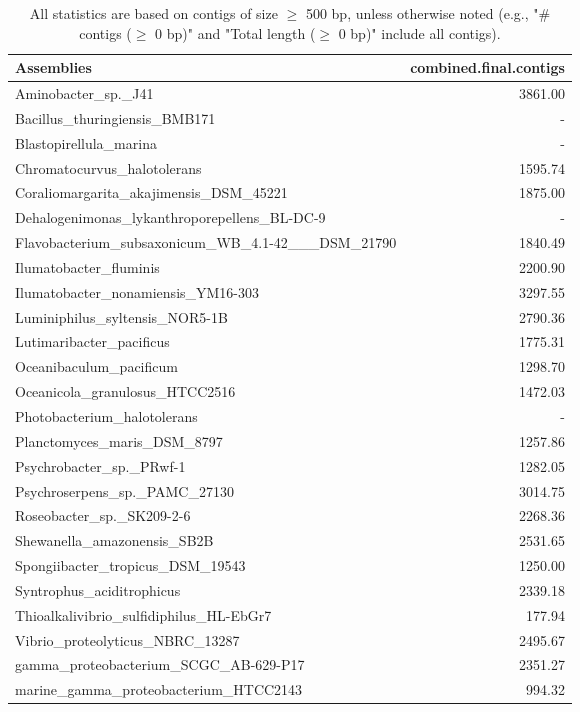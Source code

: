 \documentclass[12pt,a4paper]{article}
\begin{document}
\begin{table}[ht]
\begin{center}
\caption{All statistics are based on contigs of size $\geq$ 500 bp, unless otherwise noted (e.g., "\# contigs ($\geq$ 0 bp)" and "Total length ($\geq$ 0 bp)" include all contigs).}
\begin{tabular}{|l*{1}{|r}|}
\hline
Assemblies & combined.final.contigs \\ \hline
Aminobacter\_sp.\_J41 & 3861.00 \\ \hline
Bacillus\_thuringiensis\_BMB171 & - \\ \hline
Blastopirellula\_marina & - \\ \hline
Chromatocurvus\_halotolerans & 1595.74 \\ \hline
Coraliomargarita\_akajimensis\_DSM\_45221 & 1875.00 \\ \hline
Dehalogenimonas\_lykanthroporepellens\_BL-DC-9 & - \\ \hline
Flavobacterium\_subsaxonicum\_WB\_4.1-42\_\_\_DSM\_21790 & 1840.49 \\ \hline
Ilumatobacter\_fluminis & 2200.90 \\ \hline
Ilumatobacter\_nonamiensis\_YM16-303 & 3297.55 \\ \hline
Luminiphilus\_syltensis\_NOR5-1B & 2790.36 \\ \hline
Lutimaribacter\_pacificus & 1775.31 \\ \hline
Oceanibaculum\_pacificum & 1298.70 \\ \hline
Oceanicola\_granulosus\_HTCC2516 & 1472.03 \\ \hline
Photobacterium\_halotolerans & - \\ \hline
Planctomyces\_maris\_DSM\_8797 & 1257.86 \\ \hline
Psychrobacter\_sp.\_PRwf-1 & 1282.05 \\ \hline
Psychroserpens\_sp.\_PAMC\_27130 & 3014.75 \\ \hline
Roseobacter\_sp.\_SK209-2-6 & 2268.36 \\ \hline
Shewanella\_amazonensis\_SB2B & 2531.65 \\ \hline
Spongiibacter\_tropicus\_DSM\_19543 & 1250.00 \\ \hline
Syntrophus\_aciditrophicus & 2339.18 \\ \hline
Thioalkalivibrio\_sulfidiphilus\_HL-EbGr7 & 177.94 \\ \hline
Vibrio\_proteolyticus\_NBRC\_13287 & 2495.67 \\ \hline
gamma\_proteobacterium\_SCGC\_AB-629-P17 & 2351.27 \\ \hline
marine\_gamma\_proteobacterium\_HTCC2143 & 994.32 \\ \hline
\end{tabular}
\end{center}
\end{table}
\end{document}
